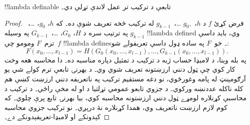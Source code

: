 \documentclass[../../../include/open-logic-section]{subfiles}
\begin{document}

\begin{lem}
!!{lambda definable} تابعې د ترکيب تر عمل لاندې تړلې دي۔
\end{lem}

\begin{proof}
فرض کړئ $f$ د $h$، $g_0,$
\dots،~$g_{k-1}$ له ترکيب څخه تعريف شوې ده۔ که $h$، $g_0$،
\dots،~$g_{k-1}$ په ترتيب سره د $H$، $G_0$،
\dots،~$G_{k-1}$ په وسيله !!{lambda defined} وي، بايد داسې
ترم~$F$ ومومو چې~$f$ !!{lambda define}s۔ خو~$F$ په ساده ډول داسې
تعريفولے شو:
\[
F(x_0, \dots, x_{l-1}) = H(G_0(x_0, \dots, x_{l-1}),
\dots, G_{k-1}(x_0, \dots, x_{l-1})).
\]
په بله وينا، د لامبډا حساب ژبه د ترکيب د تمثيل دپاره مناسبه ده۔
دا محاسبه هغه وخت کار کوي چې ټول دنني ارزښتونه تعريف شوي وي۔ د بهرنۍ تابعې ترم کولے شي يو آرګومېنټ له پامه وغورځوي، نو دغه مستقيم ترکيب په ناتعريفه دنني ارزښت کښې هم کله ناکله عددنښه ورکوي۔ د جزوي تابعو عمومي تړلتيا د  او  له مخې راځي۔ د ترکيب د محاسبې کړنلاره لومړے ټول دنني ارزښتونه محاسبه کوي، بيا بهرنۍ تابع پرې چلوي۔ که کوم لازم ارزښت ناتعريف وي، همدا کړنلاره نۀ درېږي۔ نو ترکيب جزوي محاسبه کېدونکے او لامبډا-تعريفېدونکے دے۔
\end{proof}
\end{document}
